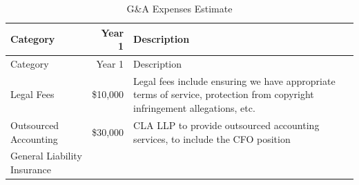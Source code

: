 \documentclass[11pt,openany]{book}
\begin{document}
\begin{longtable}[]{@{}lrl@{}}
\caption{G\&A Expenses Estimate}\tabularnewline
\toprule
\begin{minipage}[b]{0.31\columnwidth}\raggedright
Category\strut
\end{minipage} & \begin{minipage}[b]{0.12\columnwidth}\raggedleft
Year 1\strut
\end{minipage} & \begin{minipage}[b]{0.48\columnwidth}\raggedright
Description\strut
\end{minipage}\tabularnewline
\midrule
\endfirsthead
\toprule
\begin{minipage}[b]{0.31\columnwidth}\raggedright
Category\strut
\end{minipage} & \begin{minipage}[b]{0.12\columnwidth}\raggedleft
Year 1\strut
\end{minipage} & \begin{minipage}[b]{0.48\columnwidth}\raggedright
Description\strut
\end{minipage}\tabularnewline
\midrule
\endhead
\begin{minipage}[t]{0.31\columnwidth}\raggedright
Legal Fees\strut
\end{minipage} & \begin{minipage}[t]{0.12\columnwidth}\raggedleft
\$10,000\strut
\end{minipage} & \begin{minipage}[t]{0.48\columnwidth}\raggedright
Legal fees include ensuring we have appropriate terms of service,
protection from copyright infringement allegations, etc.\strut
\end{minipage}\tabularnewline
\begin{minipage}[t]{0.31\columnwidth}\raggedright
Outsourced Accounting\strut
\end{minipage} & \begin{minipage}[t]{0.12\columnwidth}\raggedleft
\$30,000\strut
\end{minipage} & \begin{minipage}[t]{0.48\columnwidth}\raggedright
CLA LLP to provide outsourced accounting services, to include the CFO
position\strut
\end{minipage}\tabularnewline
\begin{minipage}[t]{0.31\columnwidth}\raggedright
General Liability Insurance\strut
\end{minipage} & \begin{minipage}[t]{0.12\columnwidth}\raggedleft

\end{minipage}
\end{longtable}
\end{document}
